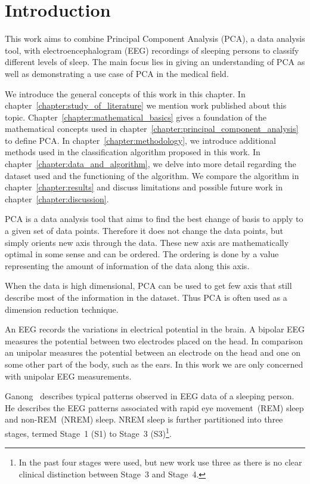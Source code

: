 \chapter{Introduction}
\label{chapter:introduction}

This work aims to combine Principal Component Analysis (PCA), a data analysis tool, with electroencephalogram (EEG) recordings of sleeping persons to classify different levels of sleep. The main focus lies in giving an understanding of PCA as well as demonstrating a use case of PCA in the medical field.

We introduce the general concepts of this work in this chapter. In chapter~\ref{chapter:study_of_literature} we mention work published about this topic. Chapter~\ref{chapter:mathematical_basics} gives a foundation of the mathematical concepts used in chapter~\ref{chapter:principal_component_analysis} to define PCA. In chapter~\ref{chapter:methodology}, we introduce additional methods used in the classification algorithm proposed in this work. In chapter~\ref{chapter:data_and_algorithm}, we delve into more detail regarding the dataset used and the functioning of the algorithm. We compare the algorithm in chapter~\ref{chapter:results} and discuss limitations and possible future work in chapter~\ref{chapter:discussion}.

PCA is a data analysis tool that aims to find the best change of basis to apply to a given set of data points. Therefore it does not change the data points, but simply orients new axis through the data. These new axis are mathematically optimal in some sense and can be ordered. The ordering is done by a value representing the amount of information of the data along this axis.

When the data is high dimensional, PCA can be used to get few axis that still describe most of the information in the dataset. Thus PCA is often used as a dimension reduction technique.


An EEG records the variations in electrical potential in the brain. A bipolar EEG measures the potential between two electrodes placed on the head. In comparison an unipolar measures the potential between an electrode on the head and one on some other part of the body, such as the ears. In this work we are only concerned with unipolar EEG measurements.

Ganong~\cite[chapter~11]{Ganong1997} describes typical patterns observed in EEG data of a sleeping person. He describes the EEG patterns associated with rapid eye movement~(REM) sleep and non-REM~(NREM) sleep. NREM sleep is further partitioned into three stages, termed Stage~1 (S1) to Stage~3 (S3)\footnote{In the past four stages were used, but new work use three as there is no clear clinical distinction between Stage~3 and Stage~4.}.

